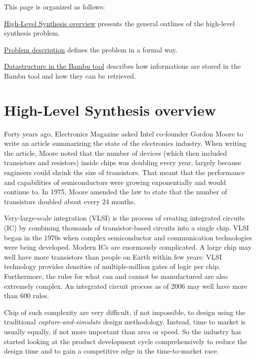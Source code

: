 This page is organized as follows\+:
\begin{DoxyItemize}
\item \hyperlink{src_HLS_page_HLS_overview}{High-\/\+Level Synthesis overview} presents the general outlines of the high-\/level synthesis problem.
\item \hyperlink{src_HLS_page_HLS_problem}{Problem description} defines the problem in a formal way.
\item \hyperlink{src_HLS_page_HLS_bambu}{Datastructure in the Bambu tool} describes how informations are stored in the Bambu tool and how they can be retrieved.
\end{DoxyItemize}\hypertarget{src_HLS_page_HLS_overview}{}\section{High-\/\+Level Synthesis overview}\label{src_HLS_page_HLS_overview}
Forty years ago, Electronics Magazine asked Intel co-\/founder Gordon Moore to write an article summarizing the state of the electronics industry. When writing the article, Moore noted that the number of devices (which then included transistors and resistors) inside chips was doubling every year, largely because engineers could shrink the size of transistors. That meant that the performance and capabilities of semiconductors were growing exponentially and would continue to. In 1975, Moore amended the law to state that the number of transistors doubled about every 24 months.

Very-\/large-\/scale integration (V\+L\+SI) is the process of creating integrated circuits (IC) by combining thousands of transistor-\/based circuits into a single chip. V\+L\+SI began in the 1970s when complex semiconductor and communication technologies were being developed. Modern I\+Cs are enormously complicated. A large chip may well have more transistors than people on Earth within few years\+: V\+L\+SI technology provides densities of multiple-\/million gates of logic per chip. Furthermore, the rules for what can and cannot be manufactured are also extremely complex. An integrated circuit process as of 2006 may well have more than 600 rules.

Chip of such complexity are very difficult, if not impossible, to design using the traditional {\itshape capture-\/and-\/simulate} design methodology. Instead, time to market is usually equally, if not more important than area or speed. So the industry has started looking at the product development cycle comprehensively to reduce the design time and to gain a competitive edge in the time-\/to-\/market race.

